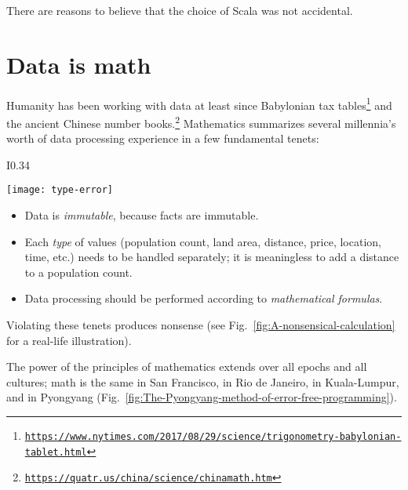 There are reasons to believe that the choice of Scala was not accidental.

\section{Data is math}

Humanity has been working with data at least since Babylonian tax
tables\footnote{\texttt{\href{https://www.nytimes.com/2017/08/29/science/trigonometry-babylonian-tablet.html}{https://www.nytimes.com/2017/08/29/science/trigonometry-babylonian-tablet.html}}}
and the ancient Chinese number books.\footnote{\texttt{\href{https://web.archive.org/web/20170425233550/https://quatr.us/china/science/chinamath.htm}{https://quatr.us/china/science/chinamath.htm}}}
Mathematics summarizes several millennia\textsf{'}s worth of data processing
experience in a few fundamental tenets:

\begin{wrapfigure}{I}{0.34\columnwidth}%
\begin{centering}
\vspace{-0.65\baselineskip}
\texttt{[image: type-error]}\vspace{-0.5\baselineskip}
\par\end{centering}
\caption{Mixing incompatible data types produces nonsensical results.\label{fig:A-nonsensical-calculation}}

\vspace{-3.5\baselineskip}
\end{wrapfigure}%

\begin{itemize}
\item Data is \emph{immutable}, because facts are immutable. 
\item Each \emph{type} of values (population count, land area, distance,
price, location, time, etc.) needs to be handled separately; it is
meaningless to add a distance to a population count.
\item Data processing should be performed according to \emph{mathematical
formulas}. 
\end{itemize}
Violating these tenets produces nonsense (see Fig.\ \ref{fig:A-nonsensical-calculation}
for a real-life illustration).

The power of the principles of mathematics extends over all epochs
and all cultures; math is the same in San Francisco, in Rio de Janeiro,
in Kuala-Lumpur, and in Pyongyang (Fig.\ \ref{fig:The-Pyongyang-method-of-error-free-programming}).


